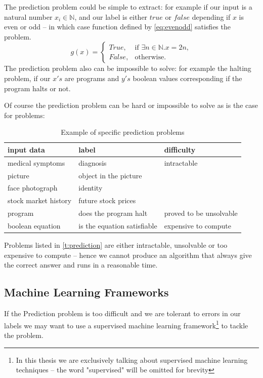 \documentclass[dissertation.tex]{subfiles}
\begin{document}
The prediction problem could be simple to extract: for example if our input is a
natural number $x_i\in\mathbb{N}$, and our label is either $true$ or $false$
depending if $x$ is even or odd -- in which case function defined by
\autoref{eq:evenodd} satisfies the problem.  \begin{equation}
  g(x) = \begin{cases}
    True, & \text{if } \exists n\in\mathbb{N}.x = 2n , \\
    False, & \text{otherwise}.
  \end{cases}
\label{eq:evenodd}
\end{equation}
The prediction problem also can be impossible to solve: for example the halting
problem, if our $x's$ are programs and $y's$ boolean values corresponding if the
program halts or not.


Of course the prediction problem can be hard or impossible to solve as is the
case for problems:
\begin{table}[H]
  \centering
    \begin{tabular}{l|l|l}
      input data & label & difficulty \\ 
      \hline
      \rowcolor{Gray}
      medical symptoms & diagnosis & intractable \\ 
      picture  & object in the picture &  \\ 
      \rowcolor{Gray}
      face photograph  & identity &  \\ 
      stock market history  & future stock prices &  \\ 
      \rowcolor{Gray}
      program  & does the program halt & proved to be unsolvable \\ 
      boolean equation  & is the equation satisfiable & expensive to compute 
  \end{tabular}
  \caption{Example of specific prediction problems }
  \label{t:prediction}
\end{table}

Problems listed in \autoref{t:prediction} are either intractable, unsolvable or
too expensive to compute -- hence we cannot produce an algorithm that always
give the correct answer and runs in a reasonable time.

\subsection{Machine Learning Frameworks}

If the Prediction problem is too difficult and we are tolerant to errors in our
labels we may want to use a supervised machine learning framework\footnote{In
this thesis we are exclusively talking about supervised machine learning
techniques -- the word "supervised" will be omitted for brevity} to tackle the
problem. 
\end{document}
